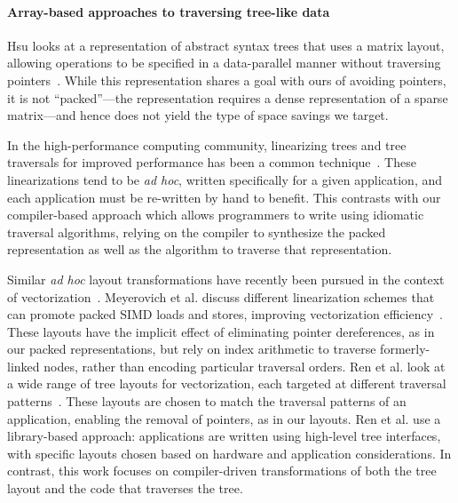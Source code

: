 
\paragraph{Array-based approaches to traversing tree-like data}

Hsu looks at a representation of abstract syntax trees that uses a matrix
layout, allowing operations to be specified in a data-parallel manner without
traversing pointers~\cite{hsu2016key}. While this representation shares a goal
with ours of avoiding pointers, it is not ``packed''---the representation
requires a dense representation of a sparse matrix---and hence does not yield
the type of space savings we target.

In the high-performance computing community, linearizing trees and tree traversals for improved
performance has been a common technique~\cite{makino90,goldfarb13sc}. These
linearizations tend to be {\em ad hoc}, written specifically for a given
application, and each application must be re-written by hand to benefit. This
contrasts with our compiler-based approach which allows programmers to write
using idiomatic traversal algorithms, relying on the compiler to synthesize
the packed representation as well as the algorithm to traverse that
representation.

Similar \emph{ad hoc} layout transformations have recently been pursued in the
context of vectorization~\cite{Meyerovich2011,ren13cgo,ren14taco}. Meyerovich
et al. discuss different linearization schemes that can promote packed SIMD
loads and stores, improving vectorization efficiency~\cite{Meyerovich2011}.
These layouts have the implicit effect of eliminating pointer dereferences, as
in our packed representations, but rely on index arithmetic to traverse
formerly-linked nodes, rather than encoding particular traversal orders. Ren
et al. look at a wide range of tree layouts for vectorization, each targeted
at different traversal patterns~\cite{ren13cgo,ren14taco}. These layouts are
chosen to match the traversal patterns of an application, enabling the removal
of pointers, as in our layouts. Ren et al. use a library-based approach:
applications are written using high-level tree interfaces, with specific
layouts chosen based on hardware and application considerations. In contrast,
this work focuses on compiler-driven transformations of both the tree layout
and the code that traverses the tree.

